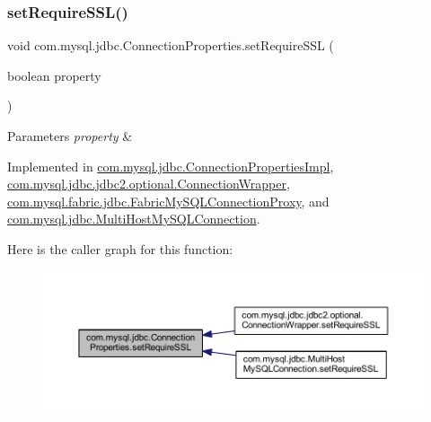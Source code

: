 \subsubsection{\texorpdfstring{set\+Require\+S\+S\+L()}{setRequireSSL()}}
{\footnotesize\ttfamily void com.\+mysql.\+jdbc.\+Connection\+Properties.\+set\+Require\+S\+SL (\begin{DoxyParamCaption}\item[{boolean}]{property }\end{DoxyParamCaption})}


\begin{DoxyParams}{Parameters}
{\em property} & \\
\hline
\end{DoxyParams}


Implemented in \mbox{\hyperlink{classcom_1_1mysql_1_1jdbc_1_1_connection_properties_impl_a7a7fd30f253879012fa5f2b7814cd33c}{com.\+mysql.\+jdbc.\+Connection\+Properties\+Impl}}, \mbox{\hyperlink{classcom_1_1mysql_1_1jdbc_1_1jdbc2_1_1optional_1_1_connection_wrapper_a7aced035eee3e3d7402a549b608e391b}{com.\+mysql.\+jdbc.\+jdbc2.\+optional.\+Connection\+Wrapper}}, \mbox{\hyperlink{classcom_1_1mysql_1_1fabric_1_1jdbc_1_1_fabric_my_s_q_l_connection_proxy_abf68799a355c2508cab5bba93f28875b}{com.\+mysql.\+fabric.\+jdbc.\+Fabric\+My\+S\+Q\+L\+Connection\+Proxy}}, and \mbox{\hyperlink{classcom_1_1mysql_1_1jdbc_1_1_multi_host_my_s_q_l_connection_a032636f890a49095b4a3574fa21b2ce8}{com.\+mysql.\+jdbc.\+Multi\+Host\+My\+S\+Q\+L\+Connection}}.

Here is the caller graph for this function\+:\nopagebreak
\begin{figure}[H]
\begin{center}
\leavevmode
\includegraphics[width=350pt]{interfacecom_1_1mysql_1_1jdbc_1_1_connection_properties_a8ed305ab3368867b5a6cc1cc0bf67ba2_icgraph}
\end{center}
\end{figure}
\mbox{\label{interfacecom_1_1mysql_1_1jdbc_1_1_connection_properties_ac8700288ba51d4baf2062fa2a2856b88}} 
